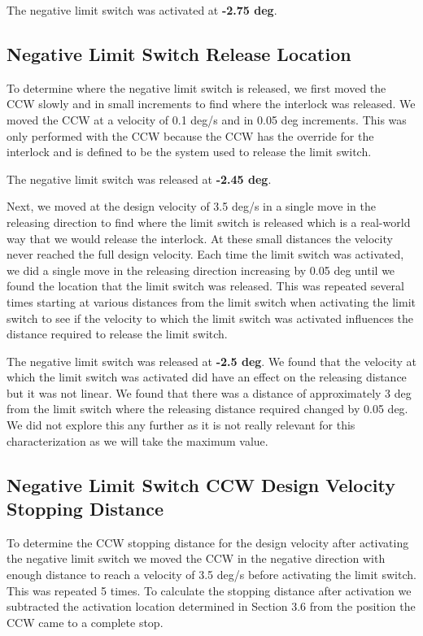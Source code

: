 \documentclass[SE,authoryear,toc]{lsstdoc}
\begin{document}
The negative limit switch was activated at \textbf{-2.75 deg}.

\subsection{Negative Limit Switch Release Location}

To determine where the negative limit switch is released, we first moved
the CCW slowly and in small increments to find where the interlock was
released. We moved the CCW at a velocity of 0.1 deg/s and in 0.05 deg
increments. This was only performed with the CCW because the CCW has the
override for the interlock and is defined to be the system used to
release the limit switch.

The negative limit switch was released at \textbf{-2.45 deg}.

Next, we moved at the design velocity of 3.5 deg/s in a single move in
the releasing direction to find where the limit switch is released which
is a real-world way that we would release the interlock. At these small
distances the velocity never reached the full design velocity. Each time
the limit switch was activated, we did a single move in the releasing
direction increasing by 0.05 deg until we found the location that the
limit switch was released. This was repeated several times starting at
various distances from the limit switch when activating the limit switch
to see if the velocity to which the limit switch was activated
influences the distance required to release the limit switch.

The negative limit switch was released at \textbf{-2.5 deg}. We found
that the velocity at which the limit switch was activated did have an
effect on the releasing distance but it was not linear. We found that
there was a distance of approximately 3 deg from the limit switch where
the releasing distance required changed by 0.05 deg. We did not explore
this any further as it is not really relevant for this characterization
as we will take the maximum value.

\subsection{Negative Limit Switch CCW Design Velocity Stopping Distance}

To determine the CCW stopping distance for the design velocity after
activating the negative limit switch we moved the CCW in the negative
direction with enough distance to reach a velocity of 3.5 deg/s before
activating the limit switch. This was repeated 5 times. To
calculate the stopping distance after activation we subtracted the
activation location determined in Section 3.6 from the position the CCW
came to a complete stop.
\end{document}
